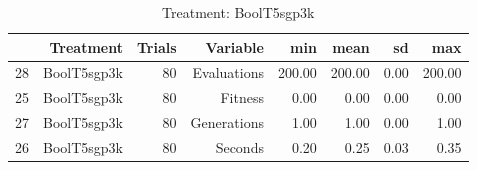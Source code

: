 \begin{table}[ht]
\centering
\begin{tabular}{rrrrrrrr}
  \hline
 & Treatment & Trials & Variable & min & mean & sd & max \\ 
  \hline
28 & BoolT5sgp3k &  80 & Evaluations & 200.00 & 200.00 & 0.00 & 200.00 \\ 
  25 & BoolT5sgp3k &  80 & Fitness & 0.00 & 0.00 & 0.00 & 0.00 \\ 
  27 & BoolT5sgp3k &  80 & Generations & 1.00 & 1.00 & 0.00 & 1.00 \\ 
  26 & BoolT5sgp3k &  80 & Seconds & 0.20 & 0.25 & 0.03 & 0.35 \\ 
   \hline
\end{tabular}
\caption{Treatment: BoolT5sgp3k} 
\end{table}
